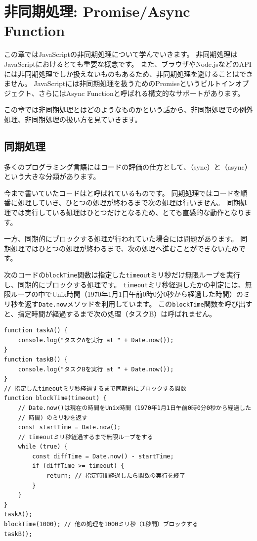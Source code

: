 \hypertarget{async-handling}{%
\chapter[非同期処理: Promise/Async Function]{非同期処理: Promise/Async
Function}\label{async-handling}}
\thispagestyle{frontheadings}

この章ではJavaScriptの非同期処理について学んでいきます。
非同期処理はJavaScriptにおけるとても重要な概念です。
また、ブラウザやNode.jsなどのAPIには非同期処理でしか扱えないものもあるため、非同期処理を避けることはできません。
JavaScriptには非同期処理を扱うためのPromiseというビルトインオブジェクト、さらにはAsync Functionと呼ばれる構文的なサポートがあります。

この章では非同期処理とはどのようなものかという話から、非同期処理での例外処理、非同期処理の扱い方を見ていきます。

\hypertarget{sync-processing}{%
\section{同期処理}\label{sync-processing}}

多くのプログラミング言語にはコードの評価の仕方として、\textbf{}（sync）と\textbf{}（async）という大きな分類があります。

今まで書いていたコードは\textbf{}と呼ばれているものです。
同期処理ではコードを順番に処理していき、ひとつの処理が終わるまで次の処理は行いません。
同期処理では実行している処理はひとつだけとなるため、とても直感的な動作となります。

一方、同期的にブロックする処理が行われていた場合には問題があります。
同期処理ではひとつの処理が終わるまで、次の処理へ進むことができないためです。

次のコードの\texttt{blockTime}関数は指定した\texttt{timeout}ミリ秒だけ無限ループを実行し、同期的にブロックする処理です。
\texttt{timeout}ミリ秒経過したかの判定には、無限ループの中でUnix時間（1970年1月1日午前0時0分0秒から経過した時間）のミリ秒を返す\texttt{Date.now}メソッドを利用しています。
この\texttt{blockTime}関数を呼び出すと、指定時間が経過するまで次の処理（タスクB）は呼ばれません。

\begin{lstlisting}
function taskA() {
    console.log("タスクAを実行 at " + Date.now());
}
function taskB() {
    console.log("タスクBを実行 at " + Date.now());
}
// 指定したtimeoutミリ秒経過するまで同期的にブロックする関数
function blockTime(timeout) { 
    // Date.now()は現在の時間をUnix時間（1970年1月1日午前0時0分0秒から経過した
    // 時間）のミリ秒を返す
    const startTime = Date.now();
    // timeoutミリ秒経過するまで無限ループをする
    while (true) {
        const diffTime = Date.now() - startTime;
        if (diffTime >= timeout) {
            return; // 指定時間経過したら関数の実行を終了
        }
    }
}
taskA();
blockTime(1000); // 他の処理を1000ミリ秒（1秒間）ブロックする
taskB();
\end{lstlisting}

